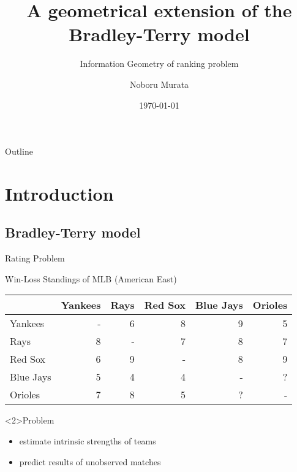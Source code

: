 \documentclass[fleqn,aspectratio=1610]{beamer}
\author{Noboru Murata}
\date{\today}
\title{A geometrical extension of the Bradley-Terry model}
\subtitle{Information Geometry of ranking problem}
\institute{\url{https://noboru-murata.github.io/}}
\begin{document}
\maketitle
\begin{frame}{Outline}
\tableofcontents
\end{frame}


\section{Introduction}
\label{sec:org16118c6}
\subsection{Bradley-Terry model}
\label{sec:orgc352d1d}
\begin{frame}[label={sec:orge50f9df}]{Rating Problem}
\begin{exampleblock}{Win-Loss Standings of MLB (American East)}\label{sec:orgccb0e9b}
\begin{center}
\begin{tabular}{l|rrrrr}
\hline
 & Yankees & Rays & Red Sox & Blue Jays & Orioles\\[0pt]
\hline
Yankees & - & 6 & 8 & 9 & 5\\[0pt]
Rays & 8 & - & 7 & 8 & 7\\[0pt]
Red Sox & 6 & 9 & - & 8 & 9\\[0pt]
Blue Jays & 5 & 4 & 4 & - & \alert{?}\\[0pt]
Orioles & 7 & 8 & 5 & \alert{?} & -\\[0pt]
\hline
\end{tabular}
\end{center}
\end{exampleblock}
\begin{alertblock}<2>{Problem}
\begin{itemize}
\item estimate intrinsic strengths of teams
\item predict results of unobserved matches
\end{itemize}
\end{alertblock}
\end{frame}
\end{document}
